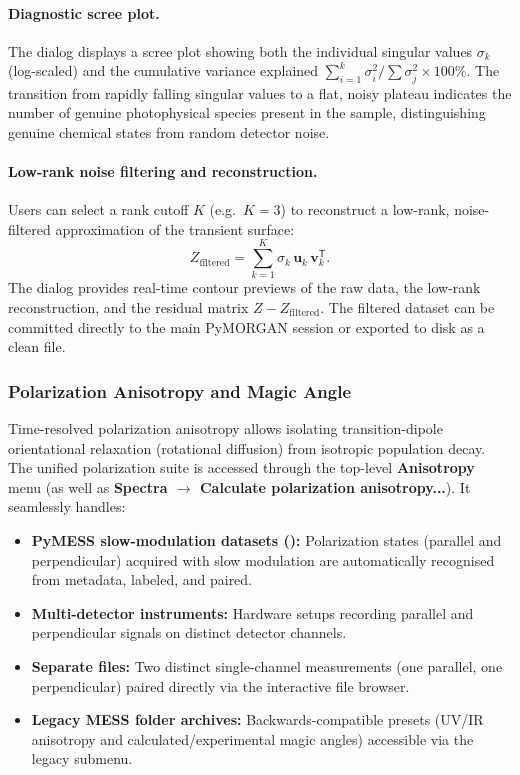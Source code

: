 \paragraph{Diagnostic scree plot.}
The dialog displays a scree plot showing both the individual singular values $\sigma_k$ (log-scaled) and the cumulative variance explained $\sum_{i=1}^k \sigma_i^2 / \sum \sigma_j^2 \times 100\%$. The transition from rapidly falling singular values to a flat, noisy plateau indicates the number of genuine photophysical species present in the sample, distinguishing genuine chemical states from random detector noise.

\paragraph{Low-rank noise filtering and reconstruction.}
Users can select a rank cutoff $K$ (e.g.\ $K=3$) to reconstruct a low-rank, noise-filtered approximation of the transient surface:
\begin{equation}
  Z_{\mathrm{filtered}} = \sum_{k=1}^{K} \sigma_k\, \mathbf{u}_k\, \mathbf{v}_k^{\mathsf{T}}.
\end{equation}
The dialog provides real-time contour previews of the raw data, the low-rank reconstruction, and the residual matrix $Z - Z_{\mathrm{filtered}}$. The filtered dataset can be committed directly to the main PyMORGAN session or exported to disk as a clean  file.

\subsubsection{Polarization Anisotropy and Magic Angle}\label{sec:oneD:anisotropy}

Time-resolved polarization anisotropy allows isolating transition-dipole orientational relaxation (rotational diffusion) from isotropic population decay. The unified polarization suite is accessed through the top-level \textbf{Anisotropy} menu (as well as \textbf{Spectra $\to$ Calculate polarization anisotropy...}). It seamlessly handles:
\begin{itemize}
  \item \textbf{PyMESS slow-modulation datasets ():} Polarization states (parallel and perpendicular) acquired with slow modulation are automatically recognised from metadata, labeled, and paired.
  \item \textbf{Multi-detector instruments:} Hardware setups recording parallel and perpendicular signals on distinct detector channels.
  \item \textbf{Separate files:} Two distinct single-channel measurements (one parallel, one perpendicular) paired directly via the interactive file browser.
  \item \textbf{Legacy MESS folder archives:} Backwards-compatible presets (UV/IR anisotropy and calculated/experimental magic angles) accessible via the legacy submenu.
\end{itemize}

